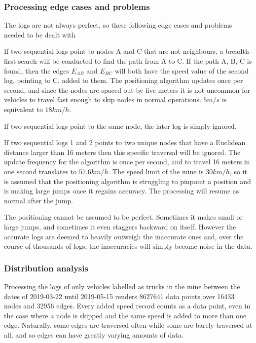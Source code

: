 \documentclass{article}
\begin{document}
			\subsubsection{Processing edge cases and problems}

				The logs are not always perfect, so these following edge cases and problems needed to be dealt with

				If two sequential logs point to nodes A and C that are not neighbours, a breadth-first search will be conducted to find the path from A to C. If the path A, B, C is found, then the edges $E_{AB}$ and $E_{BC}$ will both have the speed value of the second log, pointing to C, added to them. The positioning algorithm updates once per second, and since the nodes are spaced out by five meters it is not uncommon for vehicles to travel fast enough to skip nodes in normal operations. $5m/s$ is equivalent to $18km/h$.

				If two sequential logs point to the same node, the later log is simply ignored.

				If two sequential logs 1 and 2 points to two unique nodes that have a Euclidean distance larger than 16 meters then this specific traversal will be ignored. The update frequency for the algorithm is once per second, and to travel 16 meters in one second translates to $57.6km/h$. The speed limit of the mine is $30km/h$, so it is assumed that the positioning algorithm is struggling to pinpoint a position and is making large jumps once it regains accuracy. The processing will resume as normal after the jump.

				The positioning cannot be assumed to be perfect. Sometimes it makes small or large jumps, and sometimes it even staggers backward on itself. However the accurate logs are deemed to heavily outweigh the inaccurate ones and, over the course of thousands of logs, the inaccuracies will simply become noise in the data.

			\subsubsection{Distribution analysis}

				Processing the logs of only vehicles labelled as trucks in the mine between the dates of 2019-03-22 until 2019-05-15 renders 8627641 data points over 16433 nodes and 32956 edges. Every added speed record counts as a data point, even in the case where a node is skipped and the same speed is added to more than one edge. Naturally, some edges are traversed often while some are barely traversed at all, and so edges can have greatly varying amounts of data.
\end{document}
